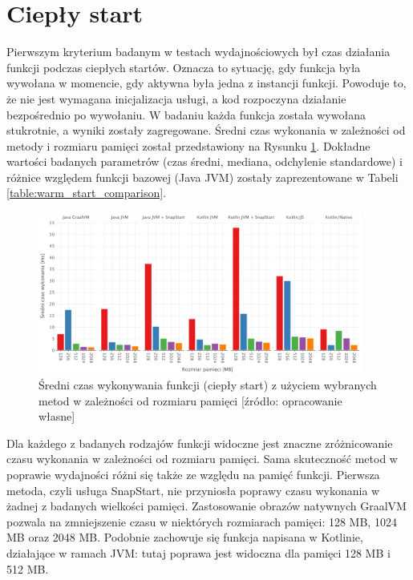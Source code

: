 \section{Ciepły start}\label{chapter:results_warm_start}

Pierwszym kryterium badanym w testach wydajnościowych był czas działania funkcji podczas ciepłych startów.
Oznacza to sytuację, gdy funkcja była wywołana w momencie, gdy aktywna była jedna z instancji funkcji.
Powoduje to, że nie jest wymagana inicjalizacja usługi, a kod rozpoczyna działanie bezpośrednio po wywołaniu.
W badaniu każda funkcja została wywołana stukrotnie, a wyniki zostały zagregowane.
Średni czas wykonania w zależności od metody i rozmiaru pamięci został przedstawiony na Rysunku \ref{fig:avg_warm_start}.
Dokładne wartości badanych parametrów (czas średni, mediana, odchylenie standardowe) i różnice względem funkcji bazowej (Java JVM) zostały zaprezentowane w Tabeli \ref{table:warm_start_comparison}.

\begin{figure}[h]
    \centering
    \includegraphics[width=0.95\textwidth]{charts/results/avg-warm-start.png}
    \caption{Średni czas wykonywania funkcji (ciepły start) z użyciem wybranych metod w zależności od rozmiaru pamięci [źródło: opracowanie własne]}
    \label{fig:avg_warm_start}
\end{figure}

Dla każdego z badanych rodzajów funkcji widoczne jest znaczne zróżnicowanie czasu wykonania w zależności od rozmiaru pamięci.
Sama skuteczność metod w poprawie wydajności różni się także ze względu na pamięć funkcji.
Pierwsza metoda, czyli usługa SnapStart, nie przyniosła poprawy czasu wykonania w żadnej z badanych wielkości pamięci.
Zastosowanie obrazów natywnych GraalVM pozwala na zmniejszenie czasu w niektórych rozmiarach pamięci: 128 MB, 1024 MB oraz 2048 MB.
Podobnie zachowuje się funkcja napisana w Kotlinie, działające w ramach JVM: tutaj poprawa jest widoczna dla pamięci 128 MB i 512 MB.


